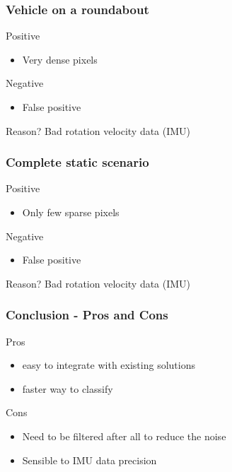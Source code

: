 \documentclass{beamer}
\begin{document}
	\begin{frame}
		\frametitle{Vehicle on a roundabout}
		\begin{exampleblock}{Positive}
		\begin{itemize}
		\item Very dense pixels
		\end{itemize}
		\end{exampleblock}
						
		\begin{alertblock}{Negative}
		\begin{itemize}
		\item False positive 
		\end{itemize}
		\end{alertblock}					

		\begin{block}{Reason?}
		Bad rotation velocity data (IMU)
		\end{block}			
	\end{frame}
	\begin{frame}
		\frametitle{Complete static scenario}
		\begin{exampleblock}{Positive}
		\begin{itemize}
		\item Only few sparse pixels
		\end{itemize}
		\end{exampleblock}
						
		\begin{alertblock}{Negative}
		\begin{itemize}
		\item False positive
		\end{itemize}
		\end{alertblock}					

		\begin{block}{Reason?}
		Bad rotation velocity data (IMU)
		\end{block}			
		
	\end{frame}			

	\begin{frame}
		\frametitle{Conclusion - Pros and Cons}
		
		\begin{block}{Pros}
			\begin{itemize}
			\item easy to integrate with existing solutions
			\item faster way to classify
			\end{itemize}
		\end{block}		
		
		\begin{block}{Cons}
			\begin{itemize}
			\item Need to be filtered after all to reduce the noise
			\item Sensible to IMU data precision
			\end{itemize}
		\end{block}
		
	\end{frame}
\end{document}
